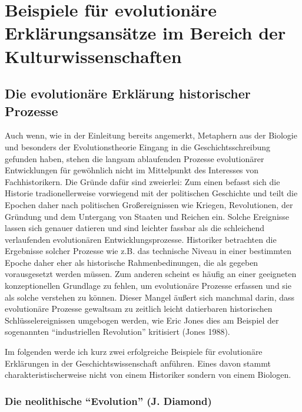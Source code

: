 \documentclass[12pt,a4paper,ngerman]{article}
\begin{document}
\section{Beispiele für evolutionäre Erklärungsansätze im Bereich der Kulturwissenschaften}

\subsection{Die evolutionäre Erklärung historischer Prozesse}

Auch wenn, wie in der Einleitung bereits angemerkt, Metaphern aus der
Biologie und besonders der Evolutionstheorie Eingang in die
Geschichtsschreibung gefunden haben, stehen die langsam ablaufenden
Prozesse evolutionärer Entwicklungen für gewöhnlich nicht im
Mittelpunkt des Interesses von Fachhistorikern. Die Gründe dafür sind
zweierlei: Zum einen befasst sich die Historie tradionellerweise
vorwiegend mit der politischen Geschichte und teilt die Epochen daher
nach politischen Großereignissen wie Kriegen, Revolutionen, der
Gründung und dem Untergang von Staaten und Reichen ein. Solche
Ereignisse lassen sich genauer datieren und sind leichter fassbar als
die schleichend verlaufenden evolutionären
Entwicklungsprozesse. Historiker betrachten die Ergebnisse solcher
Prozesse wie z.B. das technische Niveau in einer bestimmten Epoche
daher eher als historische Rahmenbedinungen, die als gegeben
vorausgesetzt werden müssen. Zum anderen scheint es häufig an einer
geeigneten konzeptionellen Grundlage zu fehlen, um evolutionäre
Prozesse erfassen und sie als solche verstehen zu können. Dieser
Mangel äußert sich manchmal darin, dass evolutionäre Prozesse
gewaltsam zu zeitlich leicht datierbaren historischen
Schlüsselereignissen umgebogen werden, wie Eric Jones dies am Beispiel
der sogenannten "`industriellen Revolution"' kritisiert (Jones 1988).

Im folgenden werde ich kurz zwei erfolgreiche Beispiele für evolutionäre
Erklärungen in der Geschichtswissenschaft anführen. Eines davon stammt
charakteristischerweise nicht von einem Historiker sondern von einem Biologen.


\subsubsection{Die neolithische "`Evolution"' (J. Diamond)}
\end{document}
